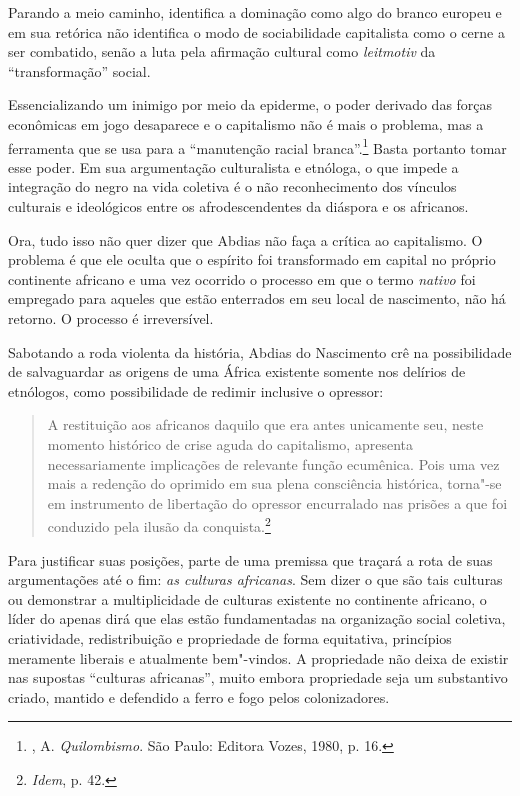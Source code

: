 Parando a meio caminho, identifica a dominação como algo do branco
europeu e em sua retórica não identifica o modo de sociabilidade
capitalista como o cerne a ser combatido, senão a luta pela afirmação
cultural como \emph{leitmotiv} da ``transformação'' social.

Essencializando um inimigo por meio da epiderme, o poder derivado das
forças econômicas em jogo desaparece e o capitalismo não é mais o
problema, mas a ferramenta que se usa para a ``manutenção racial
branca''.\footnote{, A. \emph{Quilombismo}. São Paulo: Editora
  Vozes, 1980, p. 16.} Basta portanto tomar esse poder. Em sua
argumentação culturalista e etnóloga, o que impede a integração do negro
na vida coletiva é o não reconhecimento dos vínculos culturais e
ideológicos entre os afrodescendentes da diáspora e os africanos.

Ora, tudo isso não quer dizer que Abdias não faça a crítica ao
capitalismo. O problema é que ele oculta que o espírito foi transformado
em capital no próprio continente africano e uma vez ocorrido o processo
em que o termo \emph{nativo} foi empregado para aqueles que estão
enterrados em seu local de nascimento, não há retorno. O processo é
irreversível.

Sabotando a roda violenta da história, Abdias do Nascimento crê na
possibilidade de salvaguardar as origens de uma África existente somente
nos delírios de etnólogos, como possibilidade de redimir inclusive o
opressor:

\begin{quote}
A restituição aos africanos daquilo que era antes unicamente seu, neste
momento histórico de crise aguda do capitalismo, apresenta
necessariamente implicações de relevante função ecumênica. Pois uma vez
mais a redenção do oprimido em sua plena consciência histórica, torna"-se
em instrumento de libertação do opressor encurralado nas prisões a que
foi conduzido pela ilusão da conquista.\footnote{\emph{Idem}, p. 42.}
\end{quote}

Para justificar suas posições,
parte de uma premissa que traçará a rota de suas argumentações até o
fim: \emph{as culturas africanas}. Sem dizer o que são tais culturas ou
demonstrar a multiplicidade de culturas existente no continente
africano, o líder do  apenas dirá que elas estão fundamentadas na
organização social coletiva, criatividade, redistribuição e propriedade
de forma equitativa, princípios meramente liberais e atualmente
bem"-vindos. A propriedade não
deixa de existir nas supostas ``culturas africanas'', muito embora
propriedade seja um substantivo criado, mantido e defendido a ferro e
fogo pelos colonizadores.

